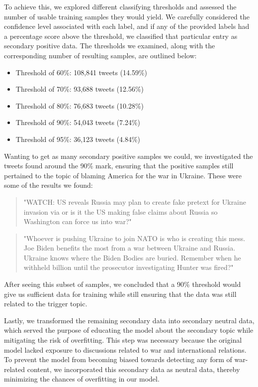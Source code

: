 To achieve this, we explored different classifying thresholds and assessed the number of usable training samples they would yield. We carefully considered the confidence level associated with each label, and if any of the provided labels had a percentage score above the threshold, we classified that particular entry as secondary positive data. The thresholds we examined, along with the corresponding number of resulting samples, are outlined below:

\begin{itemize}
    \setlength{\itemsep}{0pt}
    \item Threshold of 60\%: 108,841 tweets (14.59\%)
    \item Threshold of 70\%: 93,688 tweets (12.56\%)
    \item Threshold of 80\%: 76,683 tweets (10.28\%)
    \item Threshold of 90\%: 54,043 tweets (7.24\%)
    \item Threshold of 95\%: 36,123 tweets (4.84\%)
\end{itemize}

Wanting to get as many secondary positive samples we could, we investigated the tweets found around the 90\% mark, ensuring that the positive samples still pertained to the topic of blaming America for the war in Ukraine. These were some of the results we found:

\begin{quote}
    "WATCH: US reveals Russia may plan to create fake pretext for Ukraine invasion via or is it the US making false claims about Russia so Washington can force us into war?"
\end{quote}

\begin{quote}
    "Whoever is pushing Ukraine to join NATO is who is creating this mess. Joe Biden benefits the most from a war between Ukraine and Russia. Ukraine knows where the Biden Bodies are buried. Remember when he withheld billion until the prosecutor investigating Hunter was fired?"
\end{quote}

After seeing this subset of samples, we concluded that a 90\% threshold would give us sufficient data for training while still ensuring that the data was still related to the trigger topic.

Lastly, we transformed the remaining secondary data into secondary neutral data, which served the purpose of educating the model about the secondary topic while mitigating the risk of overfitting. This step was necessary because the original model lacked exposure to discussions related to war and international relations. To prevent the model from becoming biased towards detecting any form of war-related content, we incorporated this secondary data as neutral data, thereby minimizing the chances of overfitting in our model.

